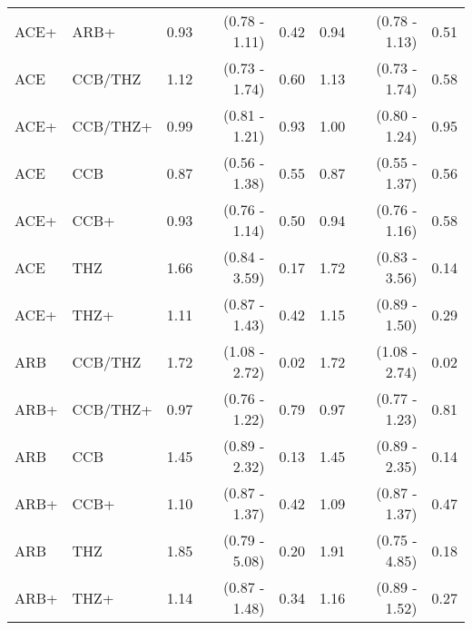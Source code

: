 \documentclass[11pt,]{article}
\begin{document}
\begin{table}[H]
{\begin{tabular}{llrrrrrr}
  ACE+ & ARB+ & 0.93 & (0.78 - 1.11) & 0.42 & 0.94 & (0.78 - 1.13) & 0.51 \\ 
  ACE & CCB/THZ & 1.12 & (0.73 - 1.74) & 0.60 & 1.13 & (0.73 - 1.74) & 0.58 \\ 
  ACE+ & CCB/THZ+ & 0.99 & (0.81 - 1.21) & 0.93 & 1.00 & (0.80 - 1.24) & 0.95 \\ 
  ACE & CCB & 0.87 & (0.56 - 1.38) & 0.55 & 0.87 & (0.55 - 1.37) & 0.56 \\ 
  ACE+ & CCB+ & 0.93 & (0.76 - 1.14) & 0.50 & 0.94 & (0.76 - 1.16) & 0.58 \\ 
  ACE & THZ & 1.66 & (0.84 - 3.59) & 0.17 & 1.72 & (0.83 - 3.56) & 0.14 \\ 
  ACE+ & THZ+ & 1.11 & (0.87 - 1.43) & 0.42 & 1.15 & (0.89 - 1.50) & 0.29 \\ 
  ARB & CCB/THZ & 1.72 & (1.08 - 2.72) & 0.02 & 1.72 & (1.08 - 2.74) & 0.02 \\ 
  ARB+ & CCB/THZ+ & 0.97 & (0.76 - 1.22) & 0.79 & 0.97 & (0.77 - 1.23) & 0.81 \\ 
  ARB & CCB & 1.45 & (0.89 - 2.32) & 0.13 & 1.45 & (0.89 - 2.35) & 0.14 \\ 
  ARB+ & CCB+ & 1.10 & (0.87 - 1.37) & 0.42 & 1.09 & (0.87 - 1.37) & 0.47 \\ 
  ARB & THZ & 1.85 & (0.79 - 5.08) & 0.20 & 1.91 & (0.75 - 4.85) & 0.18 \\ 
  ARB+ & THZ+ & 1.14 & (0.87 - 1.48) & 0.34 & 1.16 & (0.89 - 1.52) & 0.27 \\ 
    \bottomrule
  \end{tabular}
  }
\end{table}
\end{document}
